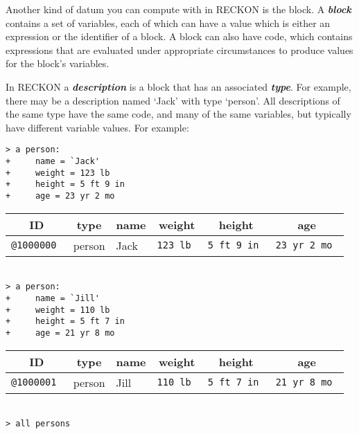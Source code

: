 \documentclass[12pt]{article}
\newcommand{\key}[1]{{\bf \em #1}\index{#1}}
\newenvironment{indpar}[1][0.3in]%
	{\begin{list}{}%
		     {\setlength{\itemsep}{0in}%
		      \setlength{\topsep}{0in}%
		      \setlength{\parsep}{1ex}%
		      \setlength{\labelwidth}{#1}%
		      \setlength{\leftmargin}{#1}%
		      \addtolength{\leftmargin}{\labelsep}}%
	 \item}%
	{\end{list}}
\begin{document}
Another kind of datum you can compute with in RECKON is
the block.  A \key{block} contains a set of variables, each of which
can have a value which is either an expression or the identifier of a
block.  A block can also
have code, which contains expressions that are evaluated under appropriate
circumstances to produce values for the block's variables.

In RECKON a \key{description}
is a block that has an associated \key{type}.  For
example, there may be a description named `Jack' with type `person'.
All descriptions
of the same type have the same code, and many of the same variables,
but typically have different variable values.  For example:

\begin{indpar}
\verb|> a person:| \\
\verb|+     name = `Jack'| \\
\verb|+     weight = 123 lb| \\
\verb|+     height = 5 ft 9 in| \\
\verb|+     age = 23 yr 2 mo| \\
\begin{tabular}{|r|l|l|r|r|r|}
\hline
\multicolumn{1}{|c}{\bf ID} &
\multicolumn{1}{|c}{\bf type} &
\multicolumn{1}{|c}{\bf name} &
\multicolumn{1}{|c}{\bf weight} &
\multicolumn{1}{|c}{\bf height} &
\multicolumn{1}{|c|}{\bf age} \\
\hline
\tt @1000000 & person & Jack & \tt 123 lb & \tt 5 ft 9 in & \tt 23 yr 2 mo \\
\hline
\end{tabular} \\[0.5ex]
\verb|> a person:| \\
\verb|+     name = `Jill'| \\
\verb|+     weight = 110 lb| \\
\verb|+     height = 5 ft 7 in| \\
\verb|+     age = 21 yr 8 mo| \\
\begin{tabular}{|r|l|l|r|r|r|}
\hline
\multicolumn{1}{|c}{\bf ID} &
\multicolumn{1}{|c}{\bf type} &
\multicolumn{1}{|c}{\bf name} &
\multicolumn{1}{|c}{\bf weight} &
\multicolumn{1}{|c}{\bf height} &
\multicolumn{1}{|c|}{\bf age} \\
\hline
\tt @1000001 & person & Jill & \tt 110 lb & \tt 5 ft 7 in & \tt 21 yr 8 mo \\
\hline
\end{tabular} \\[0.5ex]
\verb|> all persons| \\

\end{indpar}
\end{document}
